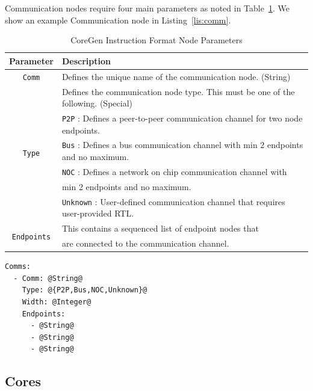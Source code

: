 \documentclass{article}
\begin{document}
Communication nodes require four main parameters as noted in Table~\ref{tab:CommParams}.  We show an example Communication 
node in Listing~\ref{lis:comm}.    

\begin{table}[h]
\begin{center}
\caption{CoreGen Instruction Format Node Parameters}
\vspace{0.125in}
\label{tab:CommParams}
\begin{tabular}{|c|l|}
\hline
\textbf{Parameter} & \textbf{Description}\\
\hline
\texttt{Comm} & Defines the unique name of the communication node. (String)\\
\hline
\multirow{6}{*}{\texttt{Type}} & Defines the communication node type.  This must be one of the following. (Special)\\
                                                   & \texttt{P2P} : Defines a peer-to-peer communication channel for two node endpoints.\\
					    & \texttt{Bus} : Defines a bus communication channel with min 2 endpoints and no maximum.\\
					    & \texttt{NOC} : Defines a network on chip communication channel with\\
					    & min 2 endpoints and no maximum.\\
					    & \texttt{Unknown} : User-defined communication channel that requires user-provided RTL.\\
\hline
\multirow{2}{*}{\texttt{Endpoints}} & This contains a sequenced list of endpoint nodes that\\
                                                            & are connected to the communication channel.\\
\hline
\end{tabular}
\end{center}
\end{table}

\vspace{0.125in}
\begin{lstlisting}[frame=single,style=base,caption={Communication Node Definition},captionpos=b,label={lis:comm}]
Comms:
  - Comm: @String@
    Type: @{P2P,Bus,NOC,Unknown}@
    Width: @Integer@
    Endpoints:
      - @String@
      - @String@
      - @String@
\end{lstlisting}

\clearpage
\subsection{Cores}
\label{sec:CoreNodes}
\end{document}
